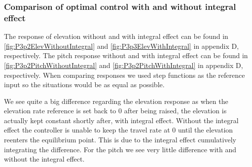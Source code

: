 \subsubsection{Comparison of optimal control with and without integral effect}

The response of elevation without and with integral effect can be found in \cref{fig:P3p2ElevWithoutIntegral} and \cref{fig:P3p3ElevWithIntegral} in appendix D, respectively. The pitch response without and with integral effect can be found in \cref{fig:P3p2PitchWithoutIntegral} and \cref{fig:P3p2PitchWithIntegral} in appendix D, respectively. When comparing responses we used step functions as the reference input so the situations would be as equal as possible. 

We see quite a big difference regarding the elevation response as when the elevation rate reference is set back to 0 after being raised, the elevation is actually kept constant shortly after, with integral effect. Without the integral effect the controller is unable to keep the travel rate at 0 until the elevation reenters the equilibrium point. This is due to the integral effect cumulatively integrating the difference. For the pitch we see very little difference with and without the integral effect.

